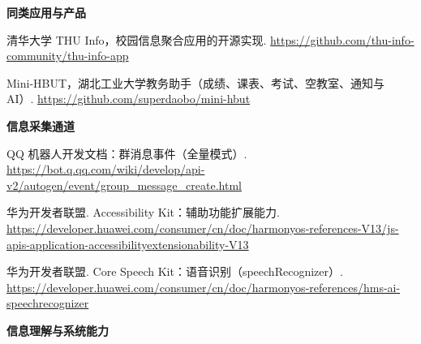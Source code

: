 \documentclass[12pt,a4paper,fontset=windows]{ctexart}
\begin{document}
{\scriptsize\raggedright\sloppy
\textbf{同类应用与产品}

\begin{enumerate}[label={[\arabic*]},leftmargin=2.4em,itemsep=1pt,topsep=2pt,parsep=0pt]
  \item 清华大学 THU Info，校园信息聚合应用的开源实现. \url{https://github.com/thu-info-community/thu-info-app}
  \item Mini-HBUT，湖北工业大学教务助手（成绩、课表、考试、空教室、通知与 AI）. \url{https://github.com/superdaobo/mini-hbut}
\end{enumerate}

\vspace{3pt}
\textbf{信息采集通道}

\begin{enumerate}[label={[\arabic*]},leftmargin=2.4em,itemsep=1pt,topsep=2pt,parsep=0pt,start=3]
  \item QQ 机器人开发文档：群消息事件（全量模式）. \url{https://bot.q.qq.com/wiki/develop/api-v2/autogen/event/group_message_create.html}
  \item 华为开发者联盟. Accessibility Kit：辅助功能扩展能力. \url{https://developer.huawei.com/consumer/cn/doc/harmonyos-references-V13/js-apis-application-accessibilityextensionability-V13}
  \item 华为开发者联盟. Core Speech Kit：语音识别（speechRecognizer）. \url{https://developer.huawei.com/consumer/cn/doc/harmonyos-references/hms-ai-speechrecognizer}
\end{enumerate}

\vspace{3pt}
\textbf{信息理解与系统能力}

}
\end{document}
